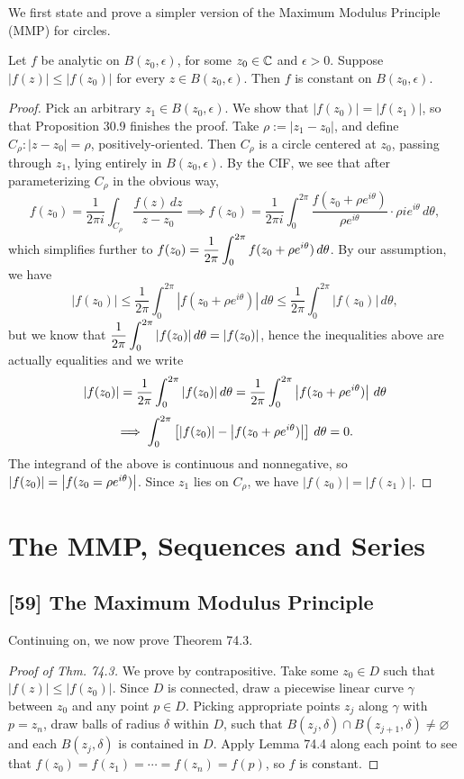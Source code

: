 \documentclass{article}
\begin{document}
We first state and prove a simpler version of the Maximum Modulus Principle (MMP) for circles.
\begin{lemma}
Let $f$ be analytic on $B(z_0, \epsilon)$, for some $z_0\in\mathbb C$ and $\epsilon>0$. Suppose $|f(z)| \leq |f(z_0)|$ for every $z\in B(z_0, \epsilon)$. Then $f$ is constant on $B(z_0,\epsilon)$.
\end{lemma}
\begin{proof}
Pick an arbitrary $z_1\in B(z_0, \epsilon)$. We show that $|f(z_0)| = |f(z_1)|$, so that Proposition 30.9 finishes the proof. Take $\rho:= |z_1 - z_0|$, and define $C_\rho: |z-z_0| = \rho$, positively-oriented. Then $C_\rho$ is a circle centered at $z_0$, passing through $z_1$, lying entirely in $B(z_0, \epsilon)$. By the CIF, we see that after parameterizing $C_\rho$ in the obvious way,
$$f(z_0) = \frac 1{2\pi i}\int_{C_\rho} \frac{f(z)\, dz}{z-z_0} \implies f(z_0) = \frac 1{2\pi i}\int_0^{2\pi} \frac{f(z_0 + \rho e^{i\theta})}{\rho e^{i\theta}} \cdot \rho ie^{i \theta}\, d\theta,$$
which simplifies further to $\displaystyle f(z_0) = \frac 1{2\pi} \int_0^{2\pi} f(z_0+\rho e^{i\theta})\, d\theta$. By our assumption, we have
$$|f(z_0)| \leq \frac 1{2\pi}\int_0^{2\pi} |f(z_0 + \rho e^{i\theta})|\, d\theta \leq \frac 1{2\pi}\int_0^{2\pi} |f(z_0)|\, d\theta,$$
but we know that $\displaystyle\frac 1{2\pi}\int_0^{2\pi} |f(z_0)|\, d\theta = |f(z_0)|$, hence the inequalities above are actually equalities and we write
$$|f(z_0)| = \frac 1{2\pi}\int_0^{2\pi} |f(z_0)| \, d\theta = \frac 1{2\pi}\int_0^{2\pi} \left|f(z_0 + \rho e^{i\theta})\right|\, d\theta$$
$$\implies \int_0^{2\pi} \left[\left|f(z_0)\right| - \left|f(z_0 + \rho e^{i\theta})\right|\right]\, d\theta = 0.$$
The integrand of the above is continuous and nonnegative, so $|f(z_0)| = \left|f(z_0 = \rho e^{i\theta})\right|$. Since $z_1$ lies on $C_\rho$, we have $|f(z_0)| = |f(z_1)|$.
\end{proof}
\newpage
\setcounter{section}{77}
\section{The MMP, Sequences and Series}
\subsection*{[59] The Maximum Modulus Principle}
Continuing on, we now prove Theorem 74.3.
\begin{proof}[Proof of Thm. 74.3]
We prove by contrapositive. Take some $z_0\in D$ such that $|f(z)| \leq |f(z_0)|$. Since $D$ is connected, draw a piecewise linear curve $\gamma$ between $z_0$ and any point $p\in D$. Picking appropriate points $z_j$ along $\gamma$ with $p = z_n$, draw balls of radius $\delta$ within $D$, such that $B(z_j, \delta) \cap B(z_{j+1}, \delta)\neq \varnothing$ and each $B(z_j, \delta)$ is contained in $D$. Apply Lemma 74.4 along each point to see that $f(z_0) = f(z_1) = \cdots = f(z_n) = f(p)$, so $f$ is constant.
\end{proof}
\end{document}
